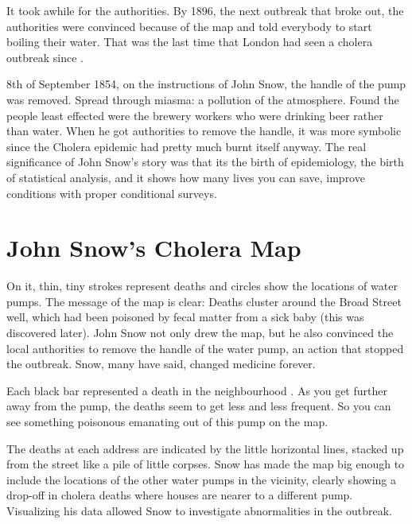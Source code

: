 \documentclass[12pt]{article}
\begin{document}
It took awhile for the authorities. By 1896, the next outbreak that broke out, the authorities were convinced because of the map and told everybody to start boiling their water. That was the last time that London had seen a cholera outbreak since \cite{tedtalk}. 

8th of September 1854, on the instructions of John Snow, the handle of the pump was removed. Spread through miasma: a pollution of the atmosphere. Found the people least effected were the brewery workers who were drinking beer rather than water. When he got authorities to remove the handle, it was more symbolic since the Cholera epidemic had pretty much burnt itself anyway. The real significance of John Snow's story was that its the birth of epidemiology, the birth of statistical analysis, and it shows how many lives you can save, improve conditions with proper conditional surveys. \cite{youtube}

\section{John Snow's Cholera Map}


On it, thin, tiny strokes represent deaths and circles show the locations of water pumps. The message of the map is clear: Deaths cluster around the Broad Street well, which had been poisoned by fecal matter from a sick baby (this was discovered later). John Snow not only drew the map, but he also convinced the local authorities to remove the handle of the water pump, an action that stopped the outbreak. Snow, many have said, changed medicine forever. \cite{heros}

Each black bar represented a death in the neighbourhood \cite{tedtalk}. As you get further away from the pump, the deaths seem to get less and less frequent. So you can see something poisonous emanating out of this pump on the map. 

The deaths at each address are indicated by the little horizontal lines, stacked up from the street like a pile of little corpses. Snow has made the map big enough to include the locations of the other water pumps in the vicinity, clearly showing a drop-off in cholera deaths where houses are nearer to a different pump. Visualizing his data allowed Snow to investigate abnormalities in the outbreak. \cite{blog}
\end{document}
